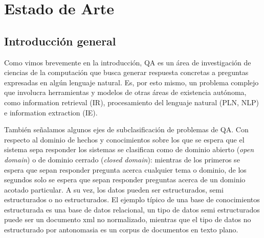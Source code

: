 \chapter{Estado de Arte}
\label{chap:estado-de-arte}

\section{Introducción general}
\label{sec:intro-general-qa}

Como vimos brevemente en la introducción, QA es un área de investigación de ciencias de la computación que busca generar respuesta concretas a preguntas expresadas en algún lenguaje natural. Es, por esto mismo, un problema complejo que involucra herramientas y modelos de otras áreas de existencia autónoma, como information retrieval (IR), procesamiento del lenguaje natural (PLN, NLP) e information extraction (IE). 

También señalamos algunos ejes de subclasificación de problemas de QA. Con respecto al dominio de hechos y conocimientos sobre los que se espera que el sistema sepa responder los sistemas se clasifican como de dominio abierto (\textit{open domain}) o de dominio cerrado (\textit{closed domain}): mientras de los primeros se espera que sepan responder pregunta acerca cualquier tema o dominio, de los segundos solo se espera que sepan responder preguntas acerca de un dominio acotado particular. A su vez, los datos pueden ser estructurados, semi estructurados o no estructurados. El ejemplo típico de una base de conocimientos estructurada es una base de datos relacional, un tipo de datos semi estructurados puede ser un documento xml no normalizado, mientras que el tipo de datos no estructurado por antonomasia es un corpus de documentos en texto plano. 

